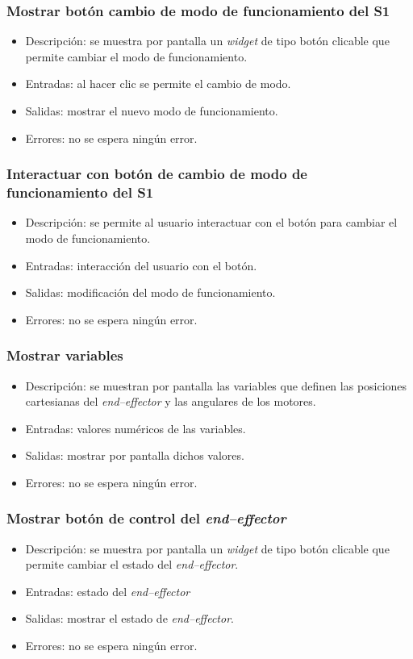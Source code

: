 \subsubsection{Mostrar botón cambio de modo de funcionamiento del \ac{S1}}
\begin{itemize}
    \item Descripción: se muestra por pantalla un \textit{widget} de tipo botón clicable que permite cambiar el modo de funcionamiento. 
    \item Entradas: al hacer clic se permite el cambio de modo.
    \item Salidas: mostrar el nuevo modo de funcionamiento.
    \item Errores: no se espera ningún error.
\end{itemize}

\subsubsection{Interactuar con botón de cambio de modo de funcionamiento del \ac{S1}}
\begin{itemize}
    \item Descripción: se permite al usuario interactuar con el botón para cambiar el modo de funcionamiento.
    \item Entradas: interacción del usuario con el botón.
    \item Salidas: modificación del modo de funcionamiento.
    \item Errores: no se espera ningún error.
\end{itemize}

\subsubsection{Mostrar variables}
\begin{itemize}
    \item Descripción: se muestran por pantalla las variables que definen las posiciones cartesianas del \textit{end--effector} y las angulares de los motores.
    \item Entradas: valores numéricos de las variables.
    \item Salidas: mostrar por pantalla dichos valores.
    \item Errores: no se espera ningún error.
\end{itemize}

\subsubsection{Mostrar botón de control del \textit{end--effector}}
\begin{itemize}
    \item Descripción: se muestra por pantalla un \textit{widget} de tipo botón clicable que permite cambiar el estado del \textit{end--effector}.
    \item Entradas: estado del \textit{end--effector}
    \item Salidas: mostrar el estado de \textit{end--effector}.
    \item Errores: no se espera ningún error.
\end{itemize}

